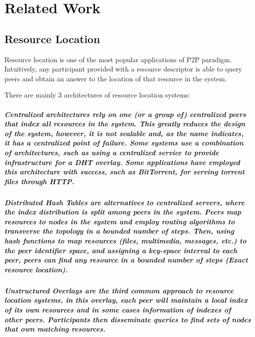 \chapter{Related Work}
\label{cha:related_work}


% 

\section{Resource Location}
\label{sec:res_location}

Resource location is one of the most popular applications of P2P paradigm. Intuitively, any participant provided with a resource descriptor is able to query peers and obtain an answer to the location of that resource in the system. 

There are mainly 3 architectures of resource location systems:

\paragraph{ \textbf{Centralized} architectures rely on one (or a group of) centralized peers that index all resources in the system. This greatly reduces the design of the system, however, it is not scalable and, as the name indicates, it has a centralized point of failure. Some systems use a combination of architectures, such as using a centralized service to provide infrastructure for a DHT overlay. Some applications have employed this architecture with success, such as BitTorrent, for serving torrent files through HTTP.}

\paragraph{ \textbf{Distributed Hash Tables} are alternatives to centralized servers, where the index distribution is split among peers in the system. Peers map resources to nodes in the system and employ routing algorithms to transverse the topology in a bounded number of steps. Then, using hash functions to map resources (files, multimedia, messages, etc.) to the peer identifier space, and assigning a key-space interval to each peer, peers can find any resource in a bounded number of steps (Exact resource location).}

\paragraph{ \textbf{Unstructured Overlays} are the third common approach to resource location systems, in this overlay, each peer will maintain a local index of its own resources and in some cases information of indexes of other peers. Participants then disseminate queries to find sets of nodes that own matching resources.}

